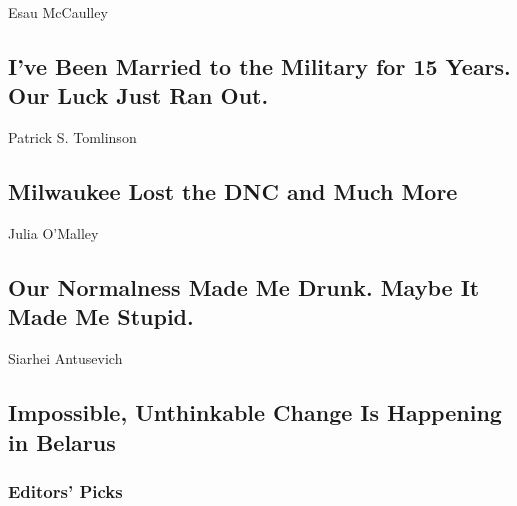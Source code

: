 \href{/2020/08/20/opinion/coronavirus-military-deployment.html}{}

Esau McCaulley

\hypertarget{ive-been-married-to-the-military-for-15-years-our-luck-just-ran-out}{%
\subsection{I've Been Married to the Military for 15 Years. Our Luck
Just Ran
Out.}\label{ive-been-married-to-the-military-for-15-years-our-luck-just-ran-out}}

\href{/2020/08/20/opinion/milwaukee-lost-convention.html}{}

Patrick S. Tomlinson

\hypertarget{milwaukee-lost-the-dnc-and-much-more}{%
\subsection{Milwaukee Lost the DNC and Much
More}\label{milwaukee-lost-the-dnc-and-much-more}}

\href{/2020/08/20/opinion/covid-alaska-fishing.html}{}

Julia O'Malley

\hypertarget{our-normalness-made-me-drunk-maybe-it-made-me-stupid}{%
\subsection{Our Normalness Made Me Drunk. Maybe It Made Me
Stupid.}\label{our-normalness-made-me-drunk-maybe-it-made-me-stupid}}

\href{/2020/08/20/opinion/belarus-strikes-workers.html}{}

Siarhei Antusevich

\hypertarget{impossible-unthinkable-change-is-happening-in-belarus}{%
\subsection{Impossible, Unthinkable Change Is Happening in
Belarus}\label{impossible-unthinkable-change-is-happening-in-belarus}}

\hypertarget{editors-picks}{%
\subsubsection{Editors' Picks}\label{editors-picks}}

\href{/2020/08/18/books/review-vesper-flights-helen-macdonald.html}{}

